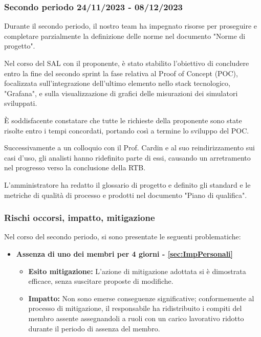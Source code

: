 \subsubsection{Secondo periodo  24/11/2023 - 08/12/2023}
Durante il secondo periodo, il nostro team ha impegnato risorse per proseguire e completare parzialmente la definizione delle norme nel documento "Norme di progetto".

Nel corso del SAL con il proponente, è stato stabilito l'obiettivo di concludere entro la fine del secondo sprint la fase relativa al Proof of Concept (POC), focalizzata sull'integrazione dell'ultimo elemento nello stack tecnologico, "Grafana", e sulla visualizzazione di grafici delle misurazioni dei simulatori sviluppati.

È soddisfacente constatare che tutte le richieste della proponente sono state risolte entro i tempi concordati, portando così a termine lo sviluppo del POC.

Successivamente a un colloquio con il Prof. Cardin e al suo reindirizzamento sui casi d'uso, gli analisti hanno ridefinito parte di essi, causando un arretramento nel progresso verso la conclusione della RTB.

L'amministratore ha redatto il glossario di progetto e definito gli standard e le metriche di qualità di processo e prodotti nel documento "Piano di qualifica".

\subsubsection*{Rischi occorsi, impatto, mitigazione} 

Nel corso del secondo periodo, si sono presentate le seguenti problematiche:
\begin{itemize}
    \item \textbf{Assenza di uno dei membri per 4 giorni - \ref{sec:ImpPersonali}}
    \begin{itemize}
        \item \textbf{Esito mitigazione:} 
        L'azione di mitigazione adottata si è dimostrata efficace, senza suscitare proposte di modifiche.
        \item \textbf{Impatto:}
        Non sono emerse conseguenze significative; conformemente al processo di mitigazione, il responsabile ha ridistribuito i compiti del membro assente assegnandoli a ruoli con un carico lavorativo ridotto durante il periodo di assenza del membro.
        \end{itemize}
\end{itemize}

